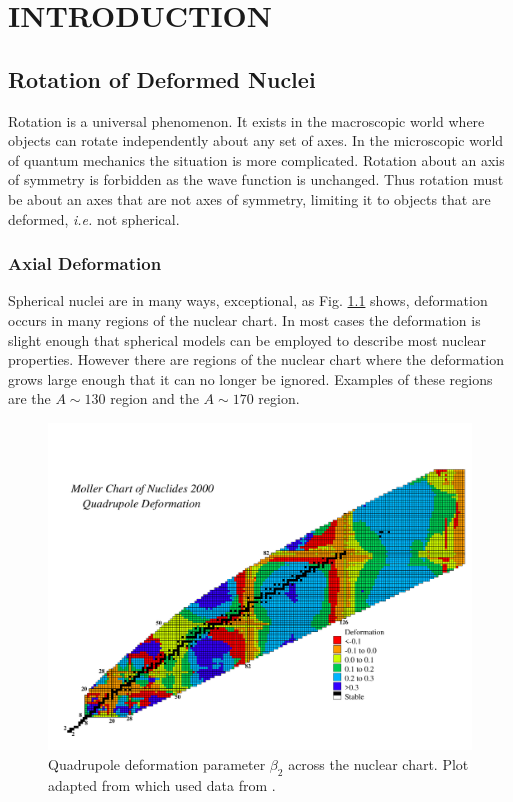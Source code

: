 %
%

\chapter{INTRODUCTION}
\label{chp:intro}
\section{Rotation of Deformed Nuclei}
\label{sec:intro-rot-def-nuc}
Rotation is a universal phenomenon. It exists in the macroscopic world where objects can rotate independently about any set of axes. In the microscopic world of quantum mechanics the situation is more complicated. Rotation about an axis of symmetry is forbidden as the wave function is unchanged. Thus rotation must be about an axes that are not axes of symmetry, limiting it to objects that are deformed, \emph{i.e.} not spherical.

\subsection{Axial Deformation}
\label{ssec:intro-rot-axial-def}
Spherical nuclei are in many ways, exceptional, as Fig. \ref{fig:chp1-quad-def} shows, deformation occurs in many regions of the nuclear chart. In most cases the deformation is slight enough that spherical models can be employed to describe most nuclear properties. However there are regions of the nuclear chart where the deformation grows large enough that it can no longer be ignored. Examples of these regions are the $A\sim{}130$ region and the $A\sim{}170$ region.

\begin{figure}[t!]
\centerline{\includegraphics[width=\textwidth,clip=true,trim=0 0 0 75]{./img/c1/chart_thb2.pdf}}
	\caption{Quadrupole deformation parameter $\beta_2$ across the nuclear chart. Plot adapted from \cite{nilssonDiagrams} which used data from \cite{mollerGroundStateDef}.\label{fig:chp1-quad-def}}
\end{figure}

